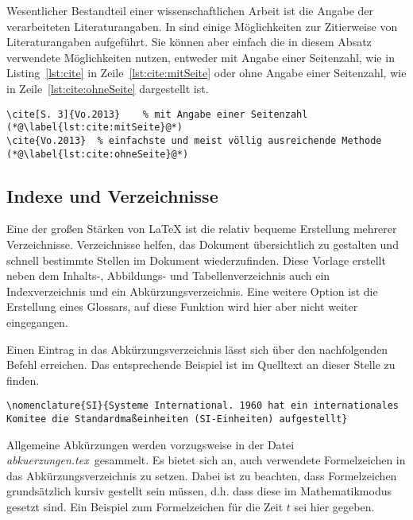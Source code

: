 Wesentlicher Bestandteil einer wissenschaftlichen Arbeit ist die Angabe der verarbeiteten Literaturangaben. In \cite[S. 3]{Vo.2013} sind einige Möglichkeiten zur Zitierweise von Literaturangaben aufgeführt. Sie können aber einfach die in diesem Absatz verwendete Möglichkeiten nutzen, entweder mit Angabe einer Seitenzahl, wie in Listing~\ref{lst:cite} in Zeile~\ref{lst:cite:mitSeite} oder ohne Angabe einer Seitenzahl, wie in Zeile~\ref{lst:cite:ohneSeite} dargestellt ist.

\label{lst:cite}
\begin{lstlisting}[caption=LaTeX-Befehle zur Angabe von Literaturangaben,label=lst:cite]
\cite[S. 3]{Vo.2013}	% mit Angabe einer Seitenzahl (*@\label{lst:cite:mitSeite}@*)
\cite{Vo.2013}	% einfachste und meist völlig ausreichende Methode (*@\label{lst:cite:ohneSeite}@*)
\end{lstlisting}

\subsection{Indexe und Verzeichnisse}
Eine der großen Stärken von LaTeX ist die relativ bequeme Erstellung mehrerer Verzeichnisse. Verzeichnisse helfen, das Dokument übersichtlich zu gestalten und schnell bestimmte Stellen im Dokument wiederzufinden. Diese Vorlage erstellt neben dem Inhalts-, Abbildungs- und Tabellenverzeichnis auch ein Indexverzeichnis und ein Abkürzungsverzeichnis. Eine weitere Option ist die Erstellung eines Glossars, auf diese Funktion wird hier aber nicht weiter eingegangen.

Einen Eintrag in das Abkürzungsverzeichnis lässt sich über den nachfolgenden Befehl erreichen. Das entsprechende Beispiel ist im Quelltext an dieser Stelle zu finden.
\begin{lstlisting}
\nomenclature{SI}{Systeme International. 1960 hat ein internationales Komitee die Standardmaßeinheiten (SI-Einheiten) aufgestellt}
\end{lstlisting}


Allgemeine Abkürzungen werden vorzugsweise in der Datei \glqq \textit{abkuerzungen.tex}\grqq ~gesammelt. Es bietet sich an, auch verwendete Formelzeichen in das Abkürzungsverzeichnis zu setzen. Dabei ist zu beachten, dass Formelzeichen grundsätzlich kursiv gestellt sein müssen, d.h. dass diese im Mathematikmodus gesetzt sind. Ein Beispiel zum Formelzeichen für die Zeit $t$  sei hier gegeben.

